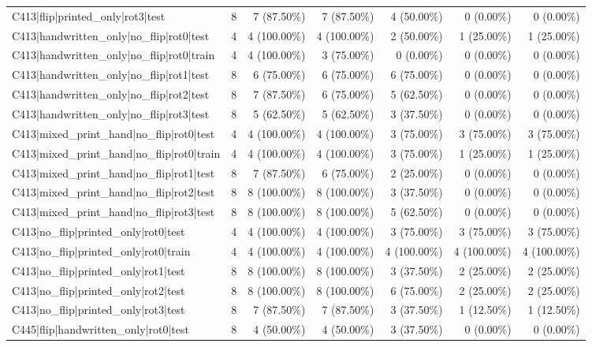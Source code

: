 \begin{longtable}{>{\raggedright\arraybackslash}p{5cm}rrrrrr}
C413|flip|printed\_only|rot3|test & 8 & 7 (87.50\%) & 7 (87.50\%) & 4 (50.00\%) & 0 (0.00\%) & 0 (0.00\%) \\
C413|handwritten\_only|no\_flip|rot0|test & 4 & 4 (100.00\%) & 4 (100.00\%) & 2 (50.00\%) & 1 (25.00\%) & 1 (25.00\%) \\
C413|handwritten\_only|no\_flip|rot0|train & 4 & 4 (100.00\%) & 3 (75.00\%) & 0 (0.00\%) & 0 (0.00\%) & 0 (0.00\%) \\
C413|handwritten\_only|no\_flip|rot1|test & 8 & 6 (75.00\%) & 6 (75.00\%) & 6 (75.00\%) & 0 (0.00\%) & 0 (0.00\%) \\
C413|handwritten\_only|no\_flip|rot2|test & 8 & 7 (87.50\%) & 6 (75.00\%) & 5 (62.50\%) & 0 (0.00\%) & 0 (0.00\%) \\
C413|handwritten\_only|no\_flip|rot3|test & 8 & 5 (62.50\%) & 5 (62.50\%) & 3 (37.50\%) & 0 (0.00\%) & 0 (0.00\%) \\
C413|mixed\_print\_hand|no\_flip|rot0|test & 4 & 4 (100.00\%) & 4 (100.00\%) & 3 (75.00\%) & 3 (75.00\%) & 3 (75.00\%) \\
C413|mixed\_print\_hand|no\_flip|rot0|train & 4 & 4 (100.00\%) & 4 (100.00\%) & 3 (75.00\%) & 1 (25.00\%) & 1 (25.00\%) \\
C413|mixed\_print\_hand|no\_flip|rot1|test & 8 & 7 (87.50\%) & 6 (75.00\%) & 2 (25.00\%) & 0 (0.00\%) & 0 (0.00\%) \\
C413|mixed\_print\_hand|no\_flip|rot2|test & 8 & 8 (100.00\%) & 8 (100.00\%) & 3 (37.50\%) & 0 (0.00\%) & 0 (0.00\%) \\
C413|mixed\_print\_hand|no\_flip|rot3|test & 8 & 8 (100.00\%) & 8 (100.00\%) & 5 (62.50\%) & 0 (0.00\%) & 0 (0.00\%) \\
C413|no\_flip|printed\_only|rot0|test & 4 & 4 (100.00\%) & 4 (100.00\%) & 3 (75.00\%) & 3 (75.00\%) & 3 (75.00\%) \\
C413|no\_flip|printed\_only|rot0|train & 4 & 4 (100.00\%) & 4 (100.00\%) & 4 (100.00\%) & 4 (100.00\%) & 4 (100.00\%) \\
C413|no\_flip|printed\_only|rot1|test & 8 & 8 (100.00\%) & 8 (100.00\%) & 3 (37.50\%) & 2 (25.00\%) & 2 (25.00\%) \\
C413|no\_flip|printed\_only|rot2|test & 8 & 8 (100.00\%) & 8 (100.00\%) & 6 (75.00\%) & 2 (25.00\%) & 2 (25.00\%) \\
C413|no\_flip|printed\_only|rot3|test & 8 & 7 (87.50\%) & 7 (87.50\%) & 3 (37.50\%) & 1 (12.50\%) & 1 (12.50\%) \\
C445|flip|handwritten\_only|rot0|test & 8 & 4 (50.00\%) & 4 (50.00\%) & 3 (37.50\%) & 0 (0.00\%) & 0 (0.00\%) \\

\end{longtable}
